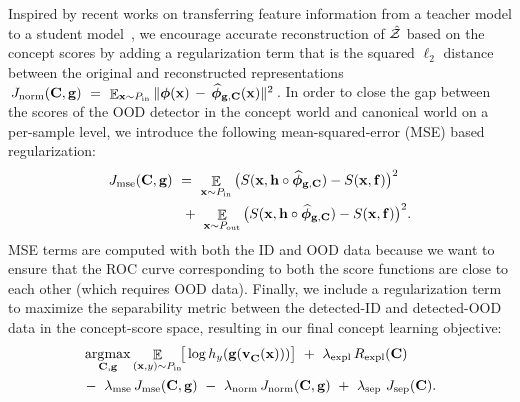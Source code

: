 Inspired by recent works on transferring feature information from a teacher model to a student model~\citep{hinton2015distilling,zhou2018rocket},
we encourage accurate reconstruction of $\hat{\mathcal{Z}}$ based on the concept scores by adding a regularization term that is the squared $\ell_2$ distance between the original and reconstructed representations $\,J_{\textrm{norm}}(\mathbf{C}, \mathbf{g}) ~=~ \mathop{\mathbb{E}}_{\mathbf{x} \sim P_{\textrm{in}}} \|\bm{\phi}(\mathbf{x}) \,-\, \widehat{\bm{\phi}}_{\mathbf{g}, \mathbf{C}}(\mathbf{x})\|^2\,$.
%
%
In order to close the gap between the scores of the OOD detector in the concept world and canonical world on a per-sample level, we introduce the following mean-squared-error (MSE) based regularization:
\begin{align}
\label{equ:regularizer_mse}
    J_{\textrm{mse}}(\mathbf{C}, \mathbf{g}) ~&=~ \mathop{\mathbb{E}}_{\mathbf{x} \sim P_{\textrm{in}}} \big( S(\mathbf{x}, \mathbf{h} \circ \widehat{\bm{\phi}}_{\mathbf{g}, \mathbf{C}}) - S(\mathbf{x}, \mathbf{f}) \big)^2 \nonumber \\
    &~+~ \mathop{\mathbb{E}}_{\mathbf{x} \sim P_{\textrm{out}}} \big( S(\mathbf{x}, \mathbf{h} \circ \widehat{\bm{\phi}}_{\mathbf{g}, \mathbf{C}}) - S(\mathbf{x}, \mathbf{f}) \big)^2 .
\end{align}
MSE terms are computed with both the ID and OOD data because we want to ensure that the ROC curve corresponding to both the score functions are close to each other (which requires OOD data).
Finally, we include a regularization term to maximize the separability metric between the detected-ID and detected-OOD data in the concept-score space, resulting in our final concept learning objective:
\begin{align}
\label{equ: concept learning}
&\argmax_{\bfC, \bfg}  \expec_{(\bfx, y) \sim \Pin}\!\!\big[ \log h_y(\bfg(\VC(\bfx))) \big] ~+~ \lambda_{\textrm{expl}}\, R_{\textrm{expl}}(\bfC) \nonumber \\ 
    &-~ \lambda_{\textrm{mse}}\, J_{\textrm{mse}}(\bfC, \bfg) ~-~ \lambda_{\textrm{norm}}\, J_{\textrm{norm}}(\bfC, \bfg) ~+~ \lambda_{\textrm{sep}}~J_{\textrm{sep}}(\bfC).
\end{align}

